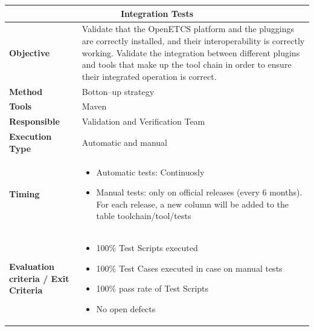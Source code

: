 \begin{center}
\begin{longtable}[H]{|p{4cm}|p{9cm}|}\hline
\multicolumn{2}{|c|}{\textbf{Integration Tests}}\\\hline
\textbf{Objective} &  Validate that the OpenETCS platform and the pluggings are correctly installed, and their interoperability is correctly working. Validate the integration between different plugins and tools that make up the tool chain in order to ensure their integrated operation is correct.\\\hline
\textbf{Method} & Botton–up strategy \\\hline
\textbf{Tools} & Maven\\\hline
\textbf{Responsible} & Validation and Verification Team\\\hline
\textbf{Execution Type} & Automatic and manual\\\hline
\textbf{Timing} & \begin{itemize}
\item Automatic tests: Continuosly
\item Manual tests: only on official releases (every 6 months). For each release, a new column will be added to the table toolchain/tool/tests
\end{itemize}  \\\hline
\textbf{Evaluation criteria / Exit Criteria} & \begin{itemize}
\item 100\% Test Scripts executed
\item 100\% Test Cases executed in case on manual tests
\item 100\% pass rate of Test Scripts
\item No open defects
\end{itemize} \\\hline
\end{longtable}
\end{center}

